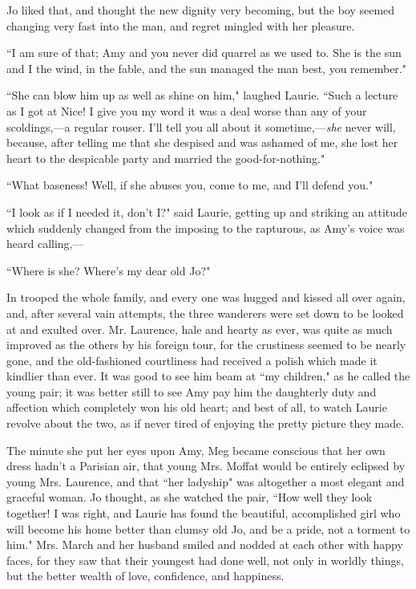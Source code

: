 Jo liked that, and thought the new dignity very becoming, but the boy
seemed changing very fast into the man, and regret mingled with her
pleasure.

``I am sure of that; Amy and you never did quarrel as we used to. She is
the sun and I the wind, in the fable, and the sun managed the man best,
you remember."

``She can blow him up as well as shine on him," laughed Laurie. ``Such a
lecture as I got at Nice! I give you my word it was a deal worse than
any of your scoldings,---a regular rouser. I'll tell you
all about it sometime,---\emph{she} never will, because, after telling
me that she despised and was ashamed of me, she lost her heart to the
despicable party and married the good-for-nothing."

``What baseness! Well, if she abuses you, come to me, and
I'll defend you."

``I look as if I needed it, don't I?" said Laurie,
getting up and striking an attitude which suddenly changed from the
imposing to the rapturous, as Amy's voice was heard
calling,---

``Where is she? Where's my dear old Jo?"

In trooped the whole family, and every one was hugged and kissed all
over again, and, after several vain attempts, the three wanderers were
set down to be looked at and exulted over. Mr. Laurence, hale and hearty
as ever, was quite as much improved as the others by his foreign tour,
for the crustiness seemed to be nearly gone, and the old-fashioned
courtliness had received a polish which made it kindlier than ever. It
was good to see him beam at ``my children," as he called the young pair;
it was better still to see Amy pay him the daughterly duty and affection
which completely won his old heart; and best of all, to watch Laurie
revolve about the two, as if never tired of enjoying the pretty picture
they made.

The minute she put her eyes upon Amy, Meg became conscious that her own
dress hadn't a Parisian air, that young Mrs. Moffat
would be entirely eclipsed by young Mrs. Laurence, and that ``her
ladyship" was altogether a most elegant and graceful woman. Jo thought,
as she watched the pair, ``How well they look together! I was right, and
Laurie has found the beautiful, accomplished girl who will become his
home better than clumsy old Jo, and be a pride, not a torment to him."
Mrs. March and her husband smiled and nodded at each other with happy
faces, for they saw that their youngest had done well, not only in
worldly things, but the better wealth of love, confidence, and
happiness.

